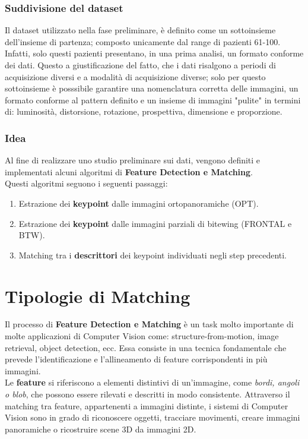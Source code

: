 \documentclass[12pt,a4paper,openright,twoside]{book}
\begin{document}
\subsection{Suddivisione del dataset}
Il dataset utilizzato nella fase preliminare, è definito come un sottoinsieme dell'insieme di partenza; composto unicamente dal range di pazienti 61-100. Infatti, solo questi pazienti presentano, in una prima analisi, un formato conforme dei dati. Questo a giustificazione del fatto, che i dati risalgono a periodi di acquisizione diversi e a modalità di acquisizione diverse; solo per questo sottoinsieme è posssibile garantire una nomenclatura corretta delle immagini, un formato conforme al pattern definito e un insieme di immagini "pulite" in termini di: luminosità, distorsione, rotazione, prospettiva, dimensione e proporzione.

\subsection{Idea}
Al fine di realizzare uno studio preliminare sui dati, vengono definiti e implementati alcuni algoritmi di \textbf{Feature Detection e Matching}.\\
Questi algoritmi seguono i seguenti passaggi:
\begin{enumerate}
\item Estrazione dei \textbf{keypoint} dalle immagini ortopanoramiche (OPT).
\item Estrazione dei \textbf{keypoint} dalle immagini parziali di bitewing (FRONTAL e BTW).
\item Matching tra i \textbf{descrittori} dei keypoint individuati negli step precedenti.
\end{enumerate}

\chapter{Tipologie di Matching}
Il processo di \textbf{Feature Detection e Matching} è un task molto importante di molte applicazioni di Computer Vision come: structure-from-motion, image retrieval, object detection, ecc. Essa consiste in una tecnica fondamentale che prevede l'identificazione e l'allineamento di feature corrispondenti in più immagini.\\
Le \textbf{feature} si riferiscono a elementi distintivi di un'immagine, come  {\itshape bordi, angoli o blob}, che possono essere rilevati e descritti in modo consistente. Attraverso il matching tra feature, appartenenti a immagini distinte, i sistemi di Computer Vision sono in grado di riconoscere oggetti, tracciare movimenti, creare immagini panoramiche o ricostruire scene 3D da immagini 2D.\\
\end{document}
